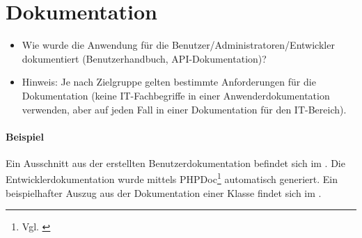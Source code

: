 \section{Dokumentation}
\label{sec:Dokumentation}

\begin{itemize}
	\item Wie wurde die Anwendung für die Benutzer/Administratoren/Entwickler dokumentiert (\zB Benutzerhandbuch, API-Dokumentation)?
	\item Hinweis: Je nach Zielgruppe gelten bestimmte Anforderungen für die Dokumentation (\zB keine IT-Fachbegriffe in einer Anwenderdokumentation verwenden, aber auf jeden Fall in einer Dokumentation für den IT-Bereich).
\end{itemize}

\paragraph{Beispiel}
Ein Ausschnitt aus der erstellten Benutzerdokumentation befindet sich im .
Die Entwicklerdokumentation wurde mittels PHPDoc\footnote{Vgl. \cite{phpDoc}} automatisch generiert.
Ein beispielhafter Auszug aus der Dokumentation einer Klasse findet sich im .
